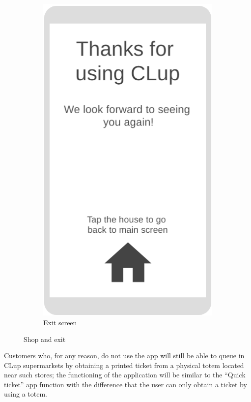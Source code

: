 \begin{figure}[h!]
\begin{subfigure}[b]{0.3\textwidth}
		\includegraphics[width=\linewidth]{../Diagrams/WireframesCLup/FinishNoRating.png}
		\caption{Exit screen}
		\label{fig:WfFinishNoRating}
	\end{subfigure}
	\caption{Shop and exit}
	\label{fig:Wireframes}
\end{figure}
Customers who, for any reason, do not use the app will still be able to queue in CLup supermarkets by obtaining a printed ticket from a physical totem located near such stores; the functioning of the application will be similar to the “Quick ticket” app function with the difference that the user can only obtain a ticket by using a totem. \\
